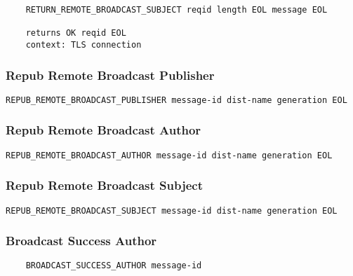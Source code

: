 \documentclass[letterpaper,11pt,oneside]{article}
\begin{document}
\vspace{10pt}
\begin{verbatim}
    RETURN_REMOTE_BROADCAST_SUBJECT reqid length EOL message EOL

    returns OK reqid EOL
    context: TLS connection
\end{verbatim}
\vspace{10pt}

\subsubsection{Repub Remote Broadcast Publisher}

\vspace{10pt}
\begin{verbatim}
REPUB_REMOTE_BROADCAST_PUBLISHER message-id dist-name generation EOL
\end{verbatim}
\vspace{10pt}

\subsubsection{Repub Remote Broadcast Author}

\vspace{10pt}
\begin{verbatim}
REPUB_REMOTE_BROADCAST_AUTHOR message-id dist-name generation EOL
\end{verbatim}
\vspace{10pt}

\subsubsection{Repub Remote Broadcast Subject}

\vspace{10pt}
\begin{verbatim}
REPUB_REMOTE_BROADCAST_SUBJECT message-id dist-name generation EOL
\end{verbatim}
\vspace{10pt}

\subsubsection{Broadcast Success Author}

\vspace{10pt}
\begin{verbatim}
    BROADCAST_SUCCESS_AUTHOR message-id
\end{verbatim}
\vspace{10pt}
\end{document}
